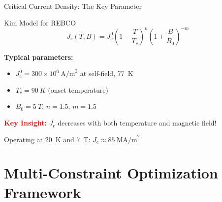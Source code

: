 \documentclass[aspectratio=169,xcolor={table,dvipsnames}]{beamer}
\newcommand{\Tesla}[1]{#1~T}
\newcommand{\Kelvin}[1]{#1~K}
\newcommand{\highlight}[1]{\textcolor{red}{\textbf{#1}}}
\newcommand{\Jc}{J_\text{c}}
\begin{document}
\begin{frame}{Critical Current Density: The Key Parameter}
    \begin{block}{Kim Model for REBCO}
        \begin{equation}
            \Jc(T,B) = \Jc^0 \left(1-\frac{T}{T_c}\right)^{n} \left(1+\frac{B}{B_0}\right)^{-m}
        \end{equation}
        
        \textbf{Typical parameters:}
        \begin{itemize}
            \item $\Jc^0 = 300 \times 10^6~\text{A/m}^2$ at self-field, \Kelvin{77}
            \item $T_c = \Kelvin{90}$ (onset temperature)
            \item $B_0 = \Tesla{5}$, $n = 1.5$, $m = 1.5$
        \end{itemize}
    \end{block}
    
    \vspace{0.3cm}
    \highlight{Key Insight:} $\Jc$ decreases with both temperature and magnetic field!
    
    \begin{center}
        Operating at \Kelvin{20} and \Tesla{7}: $\Jc \approx 85~\text{MA/m}^2$
    \end{center}
\end{frame}

\section{Multi-Constraint Optimization Framework}
\end{document}
